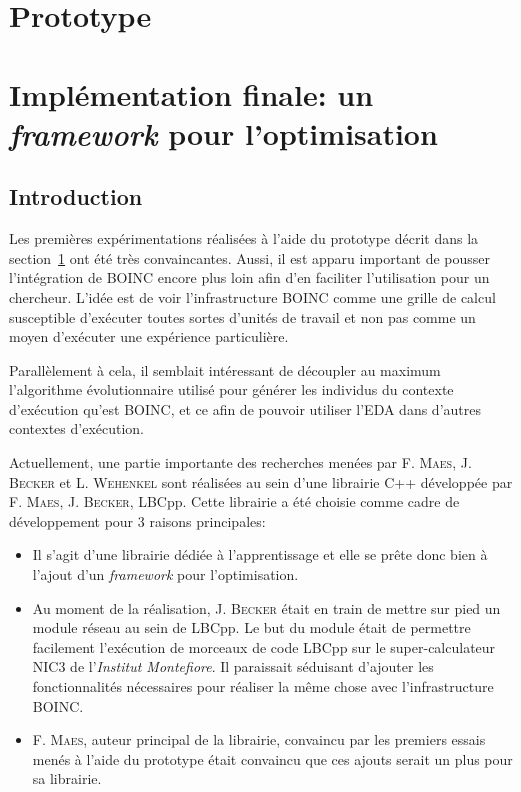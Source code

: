 \documentclass[a4paper, 11pt]{report}
\begin{document}
\section{Prototype}
\label{prototype}

\section{Implémentation finale: un \textit{framework} pour l'optimisation}
\subsection{Introduction}
\label{frameworkintro}
Les premières expérimentations réalisées à l'aide du prototype décrit dans la section~\ref{prototype} ont été très convaincantes. Aussi, il est apparu important de pousser l'intégration de \textsc{BOINC} encore plus loin afin d'en faciliter l'utilisation pour un chercheur. L'idée est de voir l'infrastructure \textsc{BOINC} comme une grille de calcul susceptible d'exécuter toutes sortes d'unités de travail et non pas comme un moyen d'exécuter une expérience particulière.

Parallèlement à cela, il semblait intéressant de découpler au maximum l'algorithme évolutionnaire utilisé pour générer les individus du contexte d'exécution qu'est \textsc{BOINC}, et ce afin de pouvoir utiliser l'EDA dans d'autres contextes d'exécution.

Actuellement, une partie importante des recherches menées par F. \textsc{Maes}, J. \textsc{Becker} et L. \textsc{Wehenkel} sont réalisées au sein d'une librairie C++ développée par F. \textsc{Maes}, J. \textsc{Becker}, LBCpp. Cette librairie a été choisie comme cadre de développement pour 3 raisons principales:
\begin{itemize}
\item Il s'agit d'une librairie dédiée à l'apprentissage et elle se prête donc bien à l'ajout d'un \textit{framework} pour l'optimisation.
\item Au moment de la réalisation, J. \textsc{Becker} était en train de mettre sur pied un module réseau au sein de LBCpp. Le but du module était de permettre facilement l'exécution de morceaux de code LBCpp sur le super-calculateur NIC3 de l'\textit{Institut Montefiore}. Il paraissait séduisant d'ajouter les fonctionnalités nécessaires pour réaliser la même chose avec l'infrastructure \textsc{BOINC}.
\item F. \textsc{Maes}, auteur principal de la librairie, convaincu par les premiers essais menés à l'aide du prototype était convaincu que ces ajouts serait un plus pour sa librairie.
\end{itemize}
\end{document}
